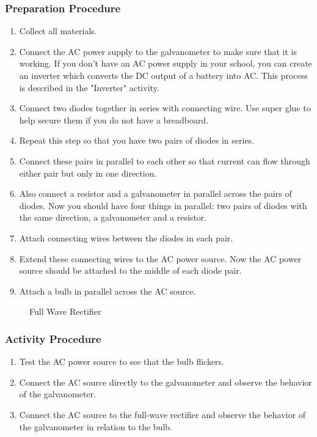\subsubsection*{Preparation Procedure}
\begin{enumerate}
\item{Collect all materials.}
\item{Connect the AC power supply to the galvanometer to make sure that it is working.  If you don't have an AC power supply in your school, you can create an inverter which converts the DC output of a battery into AC.  This process is described in the "Inverter" activity.}
\item{Connect two diodes together in series with connecting wire.  Use super glue to help secure them if you do not have a breadboard.}
\item{Repeat this step so that you have two pairs of diodes in series.}
\item{Connect these pairs in parallel to each other so that current can flow through either pair but only in one direction.}
\item{Also connect a resistor and a galvanometer in parallel across the pairs of diodes.  Now you should have four things in parallel: two pairs of diodes with the same direction, a galvanometer and a resistor.}
\item{Attach connecting wires between the diodes in each pair.}
\item{Extend these connecting wires to the AC power source.  Now the AC power source should be attached to the middle of each diode pair.}
\item{Attach a bulb in parallel across the AC source.}
\end{enumerate}

\begin{figure}
\begin{center}
\def\svgwidth{150pt}

\caption{Full Wave Rectifier}
\label{fig:full-wave-rectifier}
\end{center}
\end{figure}

\subsubsection*{Activity Procedure}
\begin{enumerate}
\item{Test the AC power source to see that the bulb flickers.}
\item{Connect the AC source directly to the galvanometer and observe the behavior of the galvanometer.}
\item{Connect the AC source to the full-wave rectifier and observe the behavior of the galvanometer in relation to the bulb.}
\end{enumerate}

